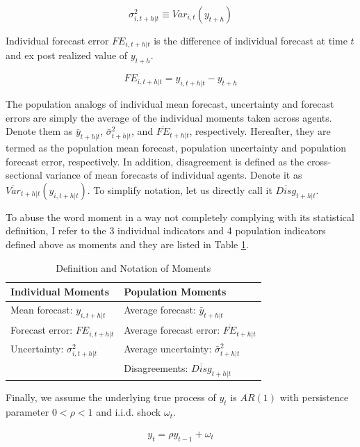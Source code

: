 \documentclass[12pt]{article}
\begin{document}
	$$\sigma^2_{i,t+h|t} \equiv Var_{i,t}( y_{t+h} )$$
	
	Individual forecast error $FE_{i,t+h|t}$ is the difference of individual forecast at time $t$ and ex post realized value of $y_{t+h}$.  
	
	$$FE_{i,t+h|t} = y_{i,t+h|t} - y_{t+h}$$
	
	The population analogs of individual mean forecast, uncertainty and forecast errors are simply the average of the individual moments taken across agents. Denote them as $\bar y_{t+h|t}$, $\bar \sigma^2_{t+h|t}$, and $\overline{FE}_{t+h|t}$, respectively. Hereafter, they are termed as the population mean forecast, population uncertainty and population forecast error, respectively. In addition, disagreement is defined as the cross-sectional variance of mean forecasts of individual agents.  Denote it as $\overline{Var}_{t+h|t}(y_{i,t+h|t}) $. To simplify notation, let us directly call it $\overline{Disg}_{t+h|t}$.  
	
	To abuse the word moment in a way not completely complying with its statistical definition, I refer to the 3 individual indicators and 4 population indicators defined above as moments and they are  listed in Table \ref{MomSum}.
	
	\begin{table}[ht]
		\centering
		\caption{Definition and Notation of Moments}
		\label{MomSum}
		\begin{tabular}{ll}
			
			\hline 
			Individual Moments                                  & Population Moments                             \\
			\hline 
			Mean forecast: $y_{i,t+h|t}$                   & Average forecast: $\bar y_{t+h|t}$                   \\
			Forecast error: $FE_{i,t+h|t}$ & Average forecast error: $\overline{FE}_{t+h|t}$ \\
			Uncertainty: $\sigma^2_{i,t+h|t}$         & Average uncertainty:  $\bar \sigma^2_{t+h|t}$ \\
			& Disagreements:  $\overline{Disg}_{t+h|t}$       \\
			\hline 
		\end{tabular}
	\end{table}
	
	Finally, we assume the underlying true process of $y_{t}$ is $AR(1)$ with persistence parameter $0<\rho <1$ and i.i.d. shock $\omega_t$. 
	
	\begin{eqnarray}\label{AR_process}
		y_{t} = \rho y_{t-1} + \omega_t
	\end{eqnarray}
	
\end{document}
